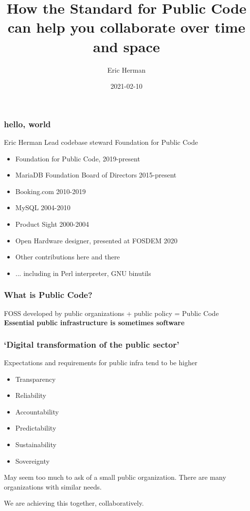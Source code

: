 \documentclass{beamer}
\title{How the Standard for Public Code can help you collaborate over time and space}
\author{Eric Herman}
\institute{Foundation for Public Code}
\date{2021-02-10}
\begin{document}
\frame{\titlepage}

\begin{frame}
\frametitle{hello, world}
Eric Herman\newline
Lead codebase steward\newline
Foundation for Public Code
\begin{itemize}
\item Foundation for Public Code, 2019-present
\item MariaDB Foundation Board of Directors 2015-present
\item Booking.com 2010-2019
\item MySQL 2004-2010
\item Product Sight 2000-2004
\item Open Hardware designer, presented at FOSDEM 2020
\item Other contributions here and there
\item ... including in Perl interpreter, GNU binutils
\end{itemize}
\end{frame}

\begin{frame}
\frametitle{What is Public Code?}
\huge{ FOSS developed by public organizations }\newline
\huge{ + public policy }\newline
\huge{ = Public Code }\newline\newline
\textbf{Essential public infrastructure is sometimes software}
\end{frame}

\begin{frame}
\frametitle{
`Digital transformation of the public sector'}
Expectations and requirements for public infra tend to be higher
\begin{itemize}
\item Transparency
\item Reliability
\item Accountability
\item Predictability
\item Sustainability
\item Sovereignty\newline
\end{itemize}
May seem too much to ask of a small public organization.\newline
There are many organizations with similar needs.\newline

We are achieving this together, collaboratively.
\end{frame}
\end{document}
